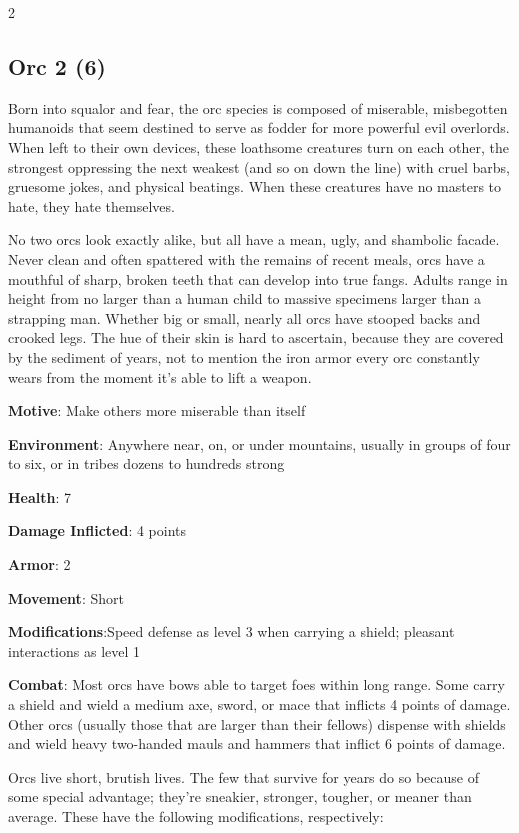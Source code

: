 \begin{multicols}{2}
\subsection{Orc	2 (6)}

Born into squalor and fear, the orc species is composed of miserable, misbegotten humanoids that seem destined to serve as fodder for more powerful evil overlords. When left to their own devices, these loathsome creatures turn on each other, the strongest oppressing the next weakest (and so on down the line) with cruel barbs, gruesome jokes, and physical beatings. When these creatures have no masters to hate, they hate themselves.

No two orcs look exactly alike, but all have a mean, ugly, and shambolic facade. Never clean and often spattered with the remains of recent meals, orcs have a mouthful of sharp, broken teeth that can develop into true fangs. Adults range in height from no larger than a human child to massive specimens larger than a strapping man. Whether big or small, nearly all orcs have stooped backs and crooked legs. The hue of their skin is hard to ascertain, because they are covered by the sediment of years, not to mention the iron armor every orc constantly wears from the moment it’s able to lift a weapon.

\textbf{Motive}: Make others more miserable than itself

\textbf{Environment}: Anywhere near, on, or under mountains, usually in groups of four to six, or in tribes dozens to hundreds strong

\textbf{Health}: 7

\textbf{Damage Inflicted}: 4 points

\textbf{Armor}: 2

\textbf{Movement}: Short

\textbf{Modifications}:Speed defense as level 3 when carrying a shield; pleasant interactions as level 1

\textbf{Combat}: Most orcs have bows able to target foes within long range. Some carry a shield and wield a medium axe, sword, or mace that inflicts 4 points of damage. Other orcs (usually those that are larger than their fellows) dispense with shields and wield heavy two-handed mauls and hammers that inflict 6 points of damage.

Orcs live short, brutish lives. The few that survive for years do so because of some special advantage; they’re sneakier, stronger, tougher, or meaner than average. These have the following modifications, respectively:


\end{multicols}
